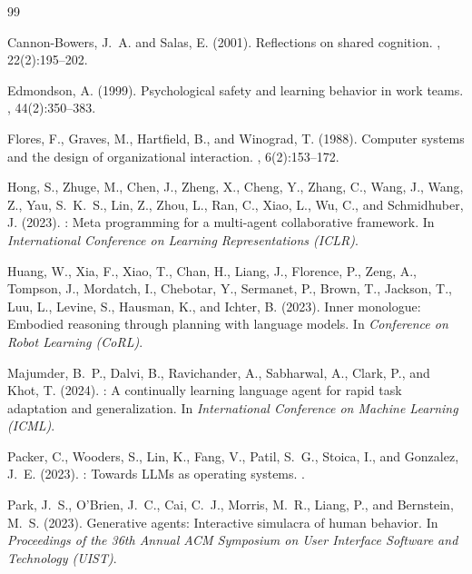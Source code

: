 \documentclass[11pt,a4paper]{article}
\begin{document}
\begin{thebibliography}{99}

Cannon-Bowers, J.~A. and Salas, E. (2001).
\newblock Reflections on shared cognition.
, 22(2):195--202.

Edmondson, A. (1999).
\newblock Psychological safety and learning behavior in work teams.
, 44(2):350--383.

Flores, F., Graves, M., Hartfield, B., and Winograd, T. (1988).
\newblock Computer systems and the design of organizational interaction.
, 6(2):153--172.

Hong, S., Zhuge, M., Chen, J., Zheng, X., Cheng, Y., Zhang, C.,
Wang, J., Wang, Z., Yau, S.~K.~S., Lin, Z., Zhou, L., Ran, C.,
Xiao, L., Wu, C., and Schmidhuber, J. (2023).
: Meta programming for a multi-agent collaborative
framework.
\newblock In {\em International Conference on Learning Representations (ICLR)}.

Huang, W., Xia, F., Xiao, T., Chan, H., Liang, J., Florence, P.,
Zeng, A., Tompson, J., Mordatch, I., Chebotar, Y., Sermanet, P.,
Brown, T., Jackson, T., Luu, L., Levine, S., Hausman, K., and
Ichter, B. (2023).
\newblock Inner monologue: Embodied reasoning through planning with
language models.
\newblock In {\em Conference on Robot Learning (CoRL)}.

Majumder, B.~P., Dalvi, B., Ravichander, A., Sabharwal, A.,
Clark, P., and Khot, T. (2024).
: A continually learning language agent for rapid task
adaptation and generalization.
\newblock In {\em International Conference on Machine Learning (ICML)}.

Packer, C., Wooders, S., Lin, K., Fang, V., Patil, S.~G.,
Stoica, I., and Gonzalez, J.~E. (2023).
: Towards {LLMs} as operating systems.
.

Park, J.~S., O'Brien, J.~C., Cai, C.~J., Morris, M.~R.,
Liang, P., and Bernstein, M.~S. (2023).
\newblock Generative agents: Interactive simulacra of human behavior.
\newblock In {\em Proceedings of the 36th Annual ACM Symposium on User
Interface Software and Technology (UIST)}.


\end{thebibliography}
\end{document}
